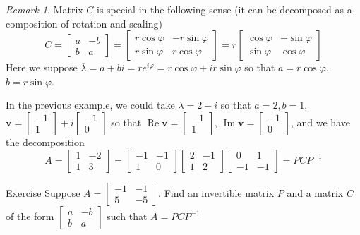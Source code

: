 \documentclass{beamer}
\theoremstyle{definition}
\theoremstyle{remark}
\newtheorem*{remark}{Remark}
\begin{document}
\begin{frame}[t]
\begin{remark}
Matrix $C$ is special in the following sense (it can be decomposed as a composition of rotation and scaling)
\[
C=\begin{bmatrix}
a&-b\\
b&a
\end{bmatrix}=\begin{bmatrix}
r\cos\varphi&-r\sin\varphi\\
r\sin\varphi&r\cos\varphi
\end{bmatrix}=r\begin{bmatrix}
\cos\varphi&-\sin\varphi\\
\sin\varphi&\cos\varphi
\end{bmatrix}
\]
Here we suppose $\overline\lambda=a+bi=re^{i\varphi}=r\cos\varphi+ir\sin\varphi$ so that $a=r\cos\varphi$, $b=r\sin\varphi$.
\end{remark}
\pause
\begin{example}
In the previous example, we could take $\lambda=2-i$ so that $a=2,b=1$, $\mathbf v=\begin{bmatrix}
-1\\1
\end{bmatrix}+i\begin{bmatrix}
-1\\0
\end{bmatrix}$ so that $\operatorname{Re}\mathbf v=\begin{bmatrix}
-1\\1
\end{bmatrix}$, $\operatorname{Im}\mathbf v=\begin{bmatrix}
-1\\0
\end{bmatrix}$, and we have the decomposition
\[
A=\begin{bmatrix}
1&-2\\
1&3
\end{bmatrix}=\begin{bmatrix}
-1&-1\\
1&0
\end{bmatrix}\begin{bmatrix}
2&-1\\
1&2
\end{bmatrix}\begin{bmatrix}
0&1\\
-1&-1
\end{bmatrix}=PCP^{-1}
\]
\end{example}
\end{frame}

\begin{frame}[t]{Exercise}
Suppose $A=\begin{bmatrix}
-1&-1\\5&-5
\end{bmatrix}$. Find an invertible matrix $P$ and a matrix $C$ of the form $\begin{bmatrix}
a&-b\\b&a
\end{bmatrix}$ such that $A=PCP^{-1}$
\end{frame}


\end{document}
